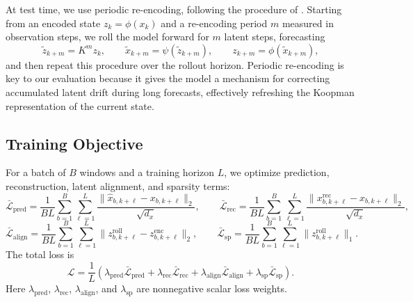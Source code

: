 At test time, we use periodic re-encoding, following the procedure of \citet{fathi_course_2023}. Starting from an encoded state $z_k = \phi(x_k)$ and a re-encoding period $m$ measured in observation steps, we roll the model forward for $m$ latent steps, forecasting
\begin{equation}
    \tilde{z}_{k+m} = K^m z_k, \qquad
    \tilde{x}_{k+m} = \psi(\tilde{z}_{k+m}), \qquad
    z_{k+m} = \phi(\tilde{x}_{k+m}),
\end{equation}
and then repeat this procedure over the rollout horizon. Periodic re-encoding is key to our evaluation because it gives the model a mechanism for correcting accumulated latent drift during long forecasts, effectively refreshing the Koopman representation of the current state.



\subsection{Training Objective}
\label{sec:training-objective}

For a batch of $B$ windows and a training horizon $L$, we optimize prediction, reconstruction, latent alignment, and sparsity terms:
\begin{equation}
\label{eq:loss-terms-state}
\bar{\mathcal{L}}_{\mathrm{pred}} =
\frac{1}{BL}\sum_{b=1}^{B}\sum_{\ell=1}^{L}
\frac{\|\hat{x}_{b,k+\ell} - x_{b,k+\ell}\|_2}{\sqrt{d_x}},
\qquad
\bar{\mathcal{L}}_{\mathrm{rec}} =
\frac{1}{BL}\sum_{b=1}^{B}\sum_{\ell=1}^{L}
\frac{\|x_{b,k+\ell}^{\mathrm{rec}} - x_{b,k+\ell}\|_2}{\sqrt{d_x}},
\end{equation}
\begin{equation}
\label{eq:loss-terms-latent}
\bar{\mathcal{L}}_{\mathrm{align}} =
\frac{1}{BL}\sum_{b=1}^{B}\sum_{\ell=1}^{L}
\|z_{b,k+\ell}^{\mathrm{roll}} - z_{b,k+\ell}^{\mathrm{enc}}\|_2,
\qquad
\bar{\mathcal{L}}_{\mathrm{sp}} =
\frac{1}{BL}\sum_{b=1}^{B}\sum_{\ell=1}^{L}
\|z_{b,k+\ell}^{\mathrm{roll}}\|_1.
\end{equation}
The total loss is
\begin{equation}
    \mathcal{L}
    =
    \frac{1}{L}
    \left(
    \lambda_{\mathrm{pred}} \bar{\mathcal{L}}_{\mathrm{pred}}
    +
    \lambda_{\mathrm{rec}} \bar{\mathcal{L}}_{\mathrm{rec}}
    +
    \lambda_{\mathrm{align}} \bar{\mathcal{L}}_{\mathrm{align}}
    +
    \lambda_{\mathrm{sp}} \bar{\mathcal{L}}_{\mathrm{sp}}
    \right).
\end{equation}
Here $\lambda_{\mathrm{pred}}$, $\lambda_{\mathrm{rec}}$, $\lambda_{\mathrm{align}}$, and $\lambda_{\mathrm{sp}}$ are nonnegative scalar loss weights.

